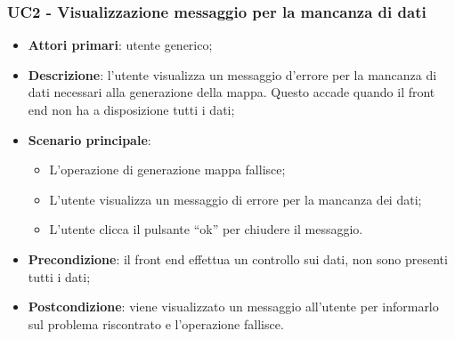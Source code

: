 \subsubsection{UC2 - Visualizzazione messaggio per la mancanza di dati }\label{visualizzazioneMessaggioMancanzaDati} %
\begin{itemize}
	\item \textbf{Attori primari}: utente generico;
	\item \textbf{Descrizione}: l’utente visualizza un messaggio d’errore per la mancanza di dati necessari alla generazione della mappa. Questo accade quando il front end non ha a disposizione tutti i dati;
	\item \textbf{Scenario principale}: 
	\begin{itemize}
		\item L’operazione di generazione mappa fallisce;
		\item L’utente visualizza un messaggio di errore per la mancanza dei dati;
		\item L’utente clicca il pulsante “ok” per chiudere il messaggio.
	\end{itemize}
	\item \textbf{Precondizione}: il front end effettua un controllo sui dati, non sono presenti tutti i dati;
	\item \textbf{Postcondizione}: viene visualizzato un messaggio all’utente per informarlo sul problema riscontrato e l’operazione fallisce.
\end{itemize}

